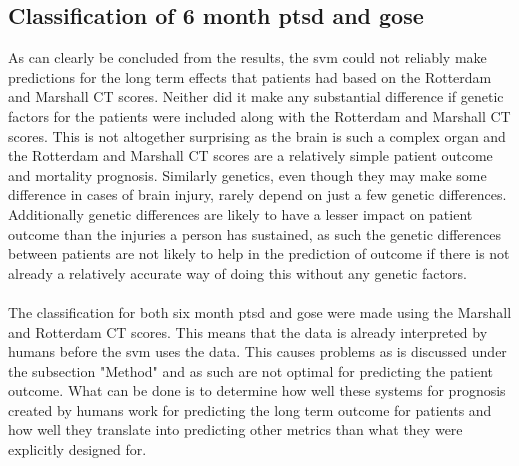 \documentclass[11pt]{article}
\begin{document}
\subsection{Classification of 6 month \gls{ptsd} and \gls{gose}}
As can clearly be concluded from the results, the \gls{svm} could not reliably make predictions for the long term effects that patients had based on the Rotterdam and Marshall CT scores. Neither did it make any substantial difference if genetic factors for the patients were included along with the Rotterdam and Marshall CT scores. This is not altogether surprising as the brain is such a complex organ and the Rotterdam and Marshall CT scores are a relatively simple patient outcome and mortality prognosis. Similarly genetics, even though they may make some difference in cases of brain injury, rarely depend on just a few genetic differences. Additionally genetic differences are likely to have a lesser impact on patient outcome than the injuries a person has sustained, as such the genetic differences between patients are not likely to help in the prediction of outcome if there is not already a relatively accurate way of doing this without any genetic factors.\\
\\
The classification for both six month \gls{ptsd} and \gls{gose} were made using the Marshall and Rotterdam CT scores. This means that the data is already interpreted by humans before the \gls{svm} uses the data. This causes problems as is discussed under the subsection "Method" and as such are not optimal for predicting the patient outcome. What can be done is to determine how well these systems for prognosis created by humans work for predicting the long term outcome for patients and how well they translate into predicting other metrics than what they were explicitly designed for.
\end{document}
